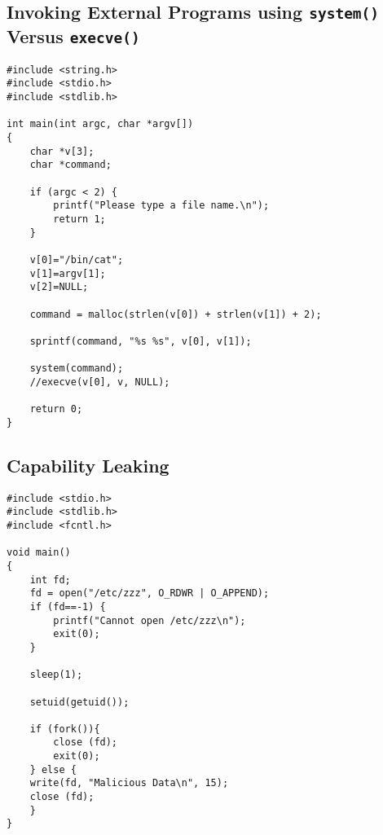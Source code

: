 \documentclass[a4paper,12pt]{article}
\begin{document}
\subsection{Invoking External Programs using \texttt{system()} Versus \texttt{execve()}}
\label{Appsec:3.8}
\begin{verbatim}
#include <string.h>
#include <stdio.h>
#include <stdlib.h>

int main(int argc, char *argv[])
{
    char *v[3];
    char *command;
    
    if (argc < 2) {
        printf("Please type a file name.\n");
        return 1;
    }
    
    v[0]="/bin/cat";
    v[1]=argv[1];
    v[2]=NULL;
    
    command = malloc(strlen(v[0]) + strlen(v[1]) + 2);
    
    sprintf(command, "%s %s", v[0], v[1]);
    
    system(command);
    //execve(v[0], v, NULL);
    
    return 0;
}
\end{verbatim}
\newpage
\subsection{Capability Leaking}
\label{Appsec:3.9}
\begin{verbatim}
#include <stdio.h>
#include <stdlib.h>
#include <fcntl.h>

void main()
{
    int fd;
    fd = open("/etc/zzz", O_RDWR | O_APPEND);
    if (fd==-1) {
        printf("Cannot open /etc/zzz\n");
        exit(0);
    }
    
    sleep(1);
    
    setuid(getuid());
    
    if (fork()){
        close (fd);
        exit(0);
    } else {
    write(fd, "Malicious Data\n", 15);
    close (fd);
    }
}
\end{verbatim}
\end{document}
